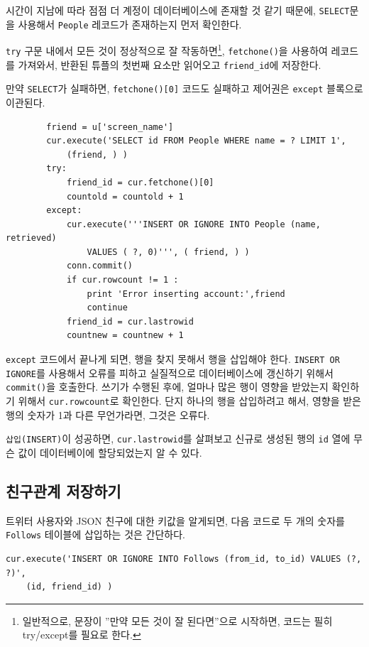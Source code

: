 시간이 지남에 따라 점점 더 계정이 데이터베이스에 존재할 것 같기 때문에, {\tt SELECT}문을 사용해서 {\tt People} 레코드가 존재하는지 먼저 확인한다.

{\tt try} 구문 내에서 모든 것이 정상적으로 잘 작동하면\footnote{일반적으로,
문장이 ''만약 모든 것이 잘 된다면''으로 시작하면, 코드는 필히 try/except를 필요로 한다.}, 
{\tt fetchone()}을 사용하여 레코드를 가져와서, 반환된 튜플의 첫번째 요소만 읽어오고 \verb"friend_id"에 저장한다.

만약 {\tt SELECT}가 실패하면, {\tt fetchone()[0]} 코드도 실패하고 제어권은 {\tt except} 블록으로 이관된다.

\beforeverb
\begin{verbatim}
        friend = u['screen_name']
        cur.execute('SELECT id FROM People WHERE name = ? LIMIT 1',
            (friend, ) )
        try:
            friend_id = cur.fetchone()[0]
            countold = countold + 1
        except:
            cur.execute('''INSERT OR IGNORE INTO People (name, retrieved) 
                VALUES ( ?, 0)''', ( friend, ) )
            conn.commit()
            if cur.rowcount != 1 :
                print 'Error inserting account:',friend
                continue
            friend_id = cur.lastrowid
            countnew = countnew + 1
\end{verbatim}
\afterverb
%

{\tt except} 코드에서 끝나게 되면, 행을 찾지 못해서 행을 삽입해야 한다.
{\tt INSERT OR IGNORE}를 사용해서 오류를 피하고 실질적으로 데이터베이스에 갱신하기 위해서
{\tt commit()}을 호출한다. 쓰기가 수행된 후에, 얼마나 많은 행이 영향을 받았는지 확인하기 위해서
{\tt cur.rowcount}로 확인한다. 단지 하나의 행을 삽입하려고 해서, 영향을 받은 행의  숫자가
1과 다른 무언가라면, 그것은 오류다.

{\tt 삽입(INSERT)}이 성공하면, {\tt cur.lastrowid}를 살펴보고 
신규로 생성된 행의 {\tt id} 열에 무슨 값이 데이터베이에 할당되었는지 알 수 있다.

\subsection{친구관계 저장하기}

트위터 사용자와 JSON 친구에 대한 키값을 알게되면, 다음 코드로 두 개의 숫자를 {\tt Follows} 테이블에 삽입하는 것은 간단하다.

\beforeverb
\begin{verbatim}
cur.execute('INSERT OR IGNORE INTO Follows (from_id, to_id) VALUES (?, ?)',
    (id, friend_id) )
\end{verbatim}
\afterverb
%

